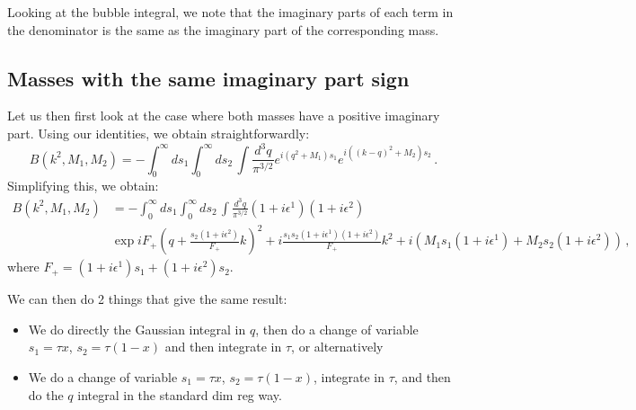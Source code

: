 \documentclass[twoside]{article}
\begin{document}
Looking at the bubble integral, we note that the imaginary parts of each term in the denominator is the same as the imaginary part of the corresponding mass. 

\subsection{Masses with the same imaginary part sign}

Let us then first look at the case where both masses have a positive imaginary part. Using our identities, we obtain straightforwardly:
\begin{equation}
\label{eq:bubble}
B(k^2,M_1,M_2)= - \int_0^\infty ds_1 \int_0^\infty ds_2\,\int \frac{d^3q}{\pi^{3/2}} e^{i(q^2+M_1)s_1}e^{i((k-q)^2+M_2)s_2}\,.
\end{equation}
Simplifying this, we obtain:
\begin{equation}
\begin{split}
B(k^2,M_1,M_2)&= - \int_0^\infty ds_1 \int_0^\infty ds_2\,\int \frac{d^3q}{\pi^{3/2}} (1 + i\epsilon^1)(1 + i\epsilon^2)\\
&\exp{i F_+ (q+ \frac{s_2(1 + i\epsilon^2)}{F_+}k)^2+i\frac{s_1 s_2(1 + i\epsilon^1)(1 + i\epsilon^2)}{F_+}k^2+ i (M_1 s_1(1 + i\epsilon^1) +M_2 s_2(1 + i\epsilon^2))}\,,
\end{split}
\end{equation}
where $F_+= (1 + i\epsilon^1)s_1+(1 + i\epsilon^2)s_2$.

We can then do 2 things that give the same result:
\begin{itemize}
\item We do directly the Gaussian integral in $q$, then do a change of variable $s_1 = \tau x$, $s_2 = \tau (1-x)$ and then integrate in $\tau$, or alternatively
\item We do a change of variable $s_1 = \tau x$, $s_2 = \tau (1-x)$, integrate in $\tau$, and then do the $q$ integral in the standard dim reg way.
\end{itemize} 
\end{document}
